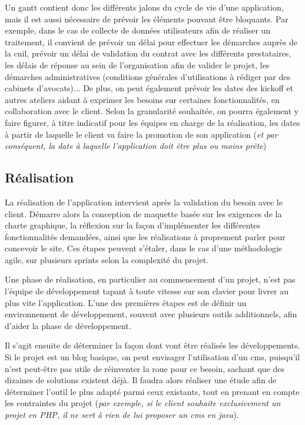 Un \gls{gantt} contient donc les différents jalons du cycle de vie d'une application, mais il est aussi nécessaire de prévoir les éléments pouvant être bloquants. Par exemple, dans le cas de collecte de données utilisateurs afin de réaliser un traitement, il convient de prévoir un délai pour effectuer les démarches auprès de la \gls{cnil}, prévoir un délai de validation du contrat avec les différents prestataires, les délais de réponse au sein de l'organisation afin de valider le projet, les démarches administratives (conditions générales d'utilisations à rédiger par des cabinets d'avocats)... De plus, on peut également prévoir les dates des \gls{kickoff} et autres ateliers aidant à exprimer les besoins sur certaines fonctionnalités, en collaboration avec le client. Selon la granularité souhaitée, on pourra également y faire figurer, à titre indicatif pour les équipes en charge de la réalisation, les dates à partir de laquelle le client va faire la promotion de son application (\emph{et par conséquent, la date à laquelle l'application doit être plus ou moins prête})

\subsection{Réalisation}

La réalisation de l'application intervient après la validation du besoin avec le client. Démarre alors la conception de maquette basée sur les exigences de la charte graphique, la réflexion sur la façon d'implémenter les différentes fonctionnalités demandées, ainsi que les réalisations à proprement parler pour concevoir le site. Ces étapes peuvent s'étaler, dans le cas d'une méthodologie agile, sur plusieurs sprints selon la complexité du projet.

Une phase de réalisation, en particulier au commencement d'un projet, n'est pas l'équipe de développement tapant à toute vitesse sur son clavier pour livrer au plus vite l'application. L'une des premières étapes est de définir un environnement de développement, souvent avec plusieurs outils additionnels, afin d'aider la phase de développement.


Il s'agit ensuite de déterminer la façon dont vont être réalisés les développements. Si le projet est un blog basique, on peut envisager l'utilisation d'un \gls{cms}, puisqu'il n'est peut-être pas utile de réinventer la roue pour ce besoin, sachant que des dizaines de solutions existent déjà. Il faudra alors réaliser une étude afin de déterminer l'outil le plus adapté parmi ceux existants, tout en prenant en compte les contraintes du projet (\emph{par exemple, si le client souhaite exclusivement un projet en \gls{PHP}, il ne sert à rien de lui proposer un \gls{cms} en java}).

